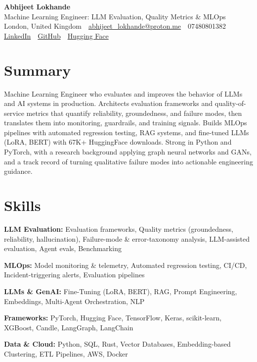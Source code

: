 \documentclass[10pt,a4paper]{article}
\newcommand{\sep}{\,\textcolor{accent!60}{\textbar}\,}
\begin{document}
\begin{center}
  {\fontsize{24}{26}\selectfont\bfseries Abhijeet Lokhande}\\[3pt]
  {\color{accent}\large Machine Learning Engineer: LLM Evaluation, Quality Metrics \& MLOps}\\[5pt]
  {\small
    London, United Kingdom \sep
    \href{mailto:abhijeet_lokhande@proton.me}{abhijeet\_lokhande@proton.me} \sep
    07480801382 \\[2pt]
    \href{https://www.linkedin.com/in/ablds/}{LinkedIn} \sep
    \href{https://github.com/abhijeetscode}{GitHub} \sep
    \href{https://huggingface.co/ab-ai}{Hugging Face}
  }
\end{center}
\vspace{2pt}

\section{Summary}
Machine Learning Engineer who evaluates and improves the behavior of LLMs and AI systems in production. Architects evaluation frameworks and quality-of-service metrics that quantify reliability, groundedness, and failure modes, then translates them into monitoring, guardrails, and training signals. Builds MLOps pipelines with automated regression testing, RAG systems, and fine-tuned LLMs (LoRA, BERT) with 67K+ HuggingFace downloads. Strong in Python and PyTorch, with a research background applying graph neural networks and GANs, and a track record of turning qualitative failure modes into actionable engineering guidance.

\section{Skills}
\begin{tight}
  \item[\textcolor{accent}{\small$\bullet$}] \textbf{LLM Evaluation:} Evaluation frameworks, Quality metrics (groundedness, reliability, hallucination), Failure-mode \& error-taxonomy analysis, LLM-assisted evaluation, Agent evals, Benchmarking
  \item[\textcolor{accent}{\small$\bullet$}] \textbf{MLOps:} Model monitoring \& telemetry, Automated regression testing, CI/CD, Incident-triggering alerts, Evaluation pipelines
  \item[\textcolor{accent}{\small$\bullet$}] \textbf{LLMs \& GenAI:} Fine-Tuning (LoRA, BERT), RAG, Prompt Engineering, Embeddings, Multi-Agent Orchestration, NLP
  \item[\textcolor{accent}{\small$\bullet$}] \textbf{Frameworks:} PyTorch, Hugging Face, TensorFlow, Keras, scikit-learn, XGBoost, Candle, LangGraph, LangChain
  \item[\textcolor{accent}{\small$\bullet$}] \textbf{Data \& Cloud:} Python, SQL, Rust, Vector Databases, Embedding-based Clustering, ETL Pipelines, AWS, Docker
\end{tight}
\end{document}
